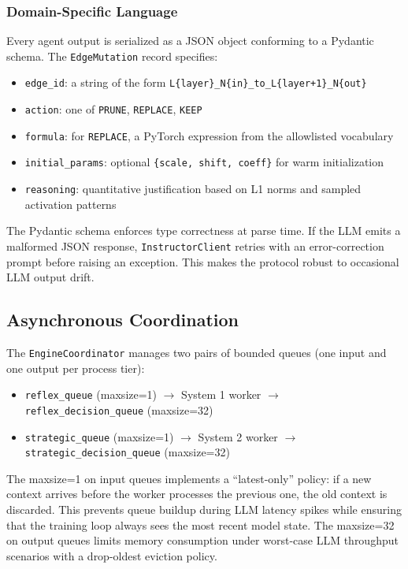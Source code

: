 \documentclass[11pt,a4paper]{article}
\begin{document}
\subsubsection{Domain-Specific Language}

Every agent output is serialized as a JSON object conforming to a Pydantic schema. The \texttt{EdgeMutation} record specifies:
\begin{itemize}
  \item \texttt{edge\_id}: a string of the form \texttt{L\{layer\}\_N\{in\}\_to\_L\{layer+1\}\_N\{out\}}
  \item \texttt{action}: one of \texttt{PRUNE}, \texttt{REPLACE}, \texttt{KEEP}
  \item \texttt{formula}: for \texttt{REPLACE}, a PyTorch expression from the allowlisted vocabulary
  \item \texttt{initial\_params}: optional \texttt{\{scale, shift, coeff\}} for warm initialization
  \item \texttt{reasoning}: quantitative justification based on L1 norms and sampled activation patterns
\end{itemize}

The Pydantic schema enforces type correctness at parse time. If the LLM emits a malformed JSON response, \texttt{InstructorClient} retries with an error-correction prompt before raising an exception. This makes the protocol robust to occasional LLM output drift.

\subsection{Asynchronous Coordination}

The \texttt{EngineCoordinator} manages two pairs of bounded queues (one input and one output per process tier):

\begin{itemize}
  \item \texttt{reflex\_queue} (maxsize=1) $\to$ System 1 worker $\to$ \texttt{reflex\_decision\_queue} (maxsize=32)
  \item \texttt{strategic\_queue} (maxsize=1) $\to$ System 2 worker $\to$ \texttt{strategic\_decision\_queue} (maxsize=32)
\end{itemize}

The maxsize=1 on input queues implements a ``latest-only'' policy: if a new context arrives before the worker processes the previous one, the old context is discarded. This prevents queue buildup during LLM latency spikes while ensuring that the training loop always sees the most recent model state. The maxsize=32 on output queues limits memory consumption under worst-case LLM throughput scenarios with a drop-oldest eviction policy.
\end{document}
